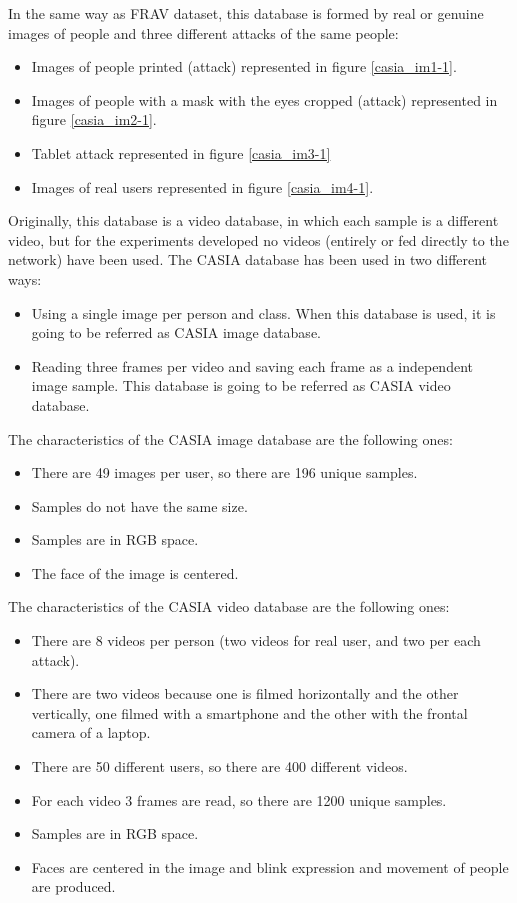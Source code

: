 In the same way as FRAV dataset, this database is formed by real or genuine images of people and three different attacks of the same people:
\begin{itemize}[noitemsep,topsep=8pt,parsep=0pt,partopsep=20pt]
 \item Images of people printed (attack) represented in figure \ref{casia_im1-1}.
 \item Images of people with a mask with the eyes cropped (attack) represented in figure \ref{casia_im2-1}.
 \item Tablet attack represented in figure \ref{casia_im3-1}
  \item Images of real users represented in figure \ref{casia_im4-1}.
 \end{itemize}

Originally, this database is a video database, in which each sample is a different video, but for the experiments developed no videos (entirely or fed directly to the network) have been used. The CASIA database has been used in two different ways:
\begin{itemize}
 \item Using a single image per person and class. When this database is used, it is going to be referred as CASIA image database.
 \item Reading three frames per video and saving each frame as a independent image sample. This database is going to be referred as CASIA video database.
\end{itemize}

The characteristics of the CASIA image database are the following ones:
\begin{itemize}[noitemsep,topsep=8pt,parsep=0pt,partopsep=20pt]
\item There are 49 images per user, so there are 196 unique samples.
\item Samples do not have the same size.
\item Samples are in RGB space.
\item The face of the image is centered.
\end{itemize}

The characteristics of the CASIA video database are the following ones:
\begin{itemize}[noitemsep,topsep=8pt,parsep=0pt,partopsep=20pt]
\item There are 8 videos per person (two videos for real user, and two per each attack).
\item There are two videos because one is filmed horizontally and the other vertically, one filmed with a smartphone and the other with the frontal camera of a laptop.
\item There are 50 different users, so there are 400 different videos.
\item For each video 3 frames are read, so there are 1200 unique samples.
\item Samples are in RGB space.
\item Faces are centered in the image and blink expression and movement of people are produced.
\end{itemize}

